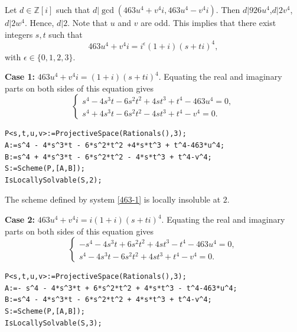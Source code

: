\documentclass[a4paper,12pt,english,reqno]{amsart}
\newcommand{\Z}{{\mathbb Z}}
\begin{document}
Let $d\in \Z[i]$ such that $d|\gcd(463u^4+v^4i,463u^4-v^4i)$. Then $d|926 u^4$,$d|2v^4$, $d|2w^4$. Hence, $d|2$. Note that $u$ and $v$ are odd. 
This implies that there exist integers $s,t$ such that 
\[463u^4+v^4i=i^{\epsilon}(1+i)(s+ti)^4,\]
with $\epsilon \in \{0,1,2,3\}$.


{\bf Case 1:} $463u^4+v^4i=(1+i)(s+ti)^4$. Equating the real and imaginary parts on both sides of this equation gives
\begin{equation}\label{463-1}
\begin{cases}
s^4 - 4s^3t - 6s^2t^2 +4st^3 + t^4-463u^4=0,\\
s^4 + 4s^3t - 6s^2t^2 - 4st^3 + t^4-v^4=0.
\end{cases}
\end{equation}


\begin{lstlisting}
P<s,t,u,v>:=ProjectiveSpace(Rationals(),3);
A:=s^4 - 4*s^3*t - 6*s^2*t^2 +4*s*t^3 + t^4-463*u^4;
B:=s^4 + 4*s^3*t - 6*s^2*t^2 - 4*s*t^3 + t^4-v^4;
S:=Scheme(P,[A,B]);
IsLocallySolvable(S,2);
\end{lstlisting}

The scheme defined by system \eqref{463-1} is locally insoluble at $2$.


{\bf Case 2:} $463u^4+v^4i=i(1+i)(s+ti)^4$. Equating the real and imaginary parts on both sides of this equation gives
\begin{equation}\label{463-2}
\begin{cases}
- s^4 - 4s^3t + 6s^2t^2 + 4st^3 - t^4-463u^4=0,\\
s^4 - 4s^3t - 6s^2t^2 + 4st^3 + t^4-v^4=0.
\end{cases}
\end{equation}


\begin{lstlisting}
P<s,t,u,v>:=ProjectiveSpace(Rationals(),3);
A:=- s^4 - 4*s^3*t + 6*s^2*t^2 + 4*s*t^3 - t^4-463*u^4;
B:=s^4 - 4*s^3*t - 6*s^2*t^2 + 4*s*t^3 + t^4-v^4;
S:=Scheme(P,[A,B]);
IsLocallySolvable(S,3);
\end{lstlisting}
\end{document}
